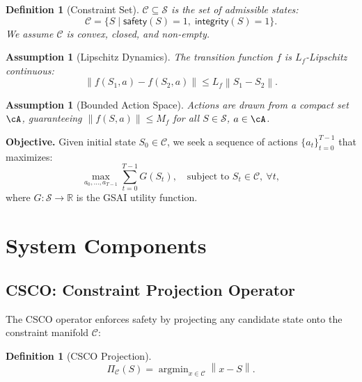 \documentclass[11pt,letterpaper]{article}
\newtheorem{definition}[theorem]{Definition}
\newtheorem{assumption}[theorem]{Assumption}
\newcommand{\cC}{\mathcal{C}}
\newcommand{\cS}{\mathcal{S}}
\newcommand{\bR}{\mathbb{R}}
\newcommand{\norm}[1]{\left\lVert#1\right\rVert}
\newcommand{\argmin}{\operatorname{argmin}}
\begin{document}
\begin{definition}[Constraint Set]
$\cC \subseteq \cS$ is the set of admissible states:
\begin{equation}
    \cC = \{S \mid \textsf{safety}(S) = 1,\; \textsf{integrity}(S) = 1\}.
    \label{eq:constraint_set}
\end{equation}
We assume $\cC$ is convex, closed, and non-empty.
\end{definition}

\begin{assumption}[Lipschitz Dynamics]
The transition function $f$ is $L_f$-Lipschitz continuous:
\begin{equation}
    \norm{f(S_1, a) - f(S_2, a)} \leq L_f \norm{S_1 - S_2}.
    \label{eq:lipschitz_f}
\end{equation}
\end{assumption}

\begin{assumption}[Bounded Action Space]
Actions are drawn from a compact set $\cA$, guaranteeing
$\norm{f(S, a)} \leq M_f$ for all $S \in \cS$, $a \in \cA$.
\end{assumption}

\noindent\textbf{Objective.}
Given initial state $S_0 \in \cC$, we seek a sequence of actions
$\{a_t\}_{t=0}^{T-1}$ that maximizes:
\begin{equation}
    \max_{a_0,\ldots,a_{T-1}} \sum_{t=0}^{T-1} G(S_t),
    \quad \text{subject to } S_t \in \cC,\ \forall t,
    \label{eq:objective}
\end{equation}
where $G: \cS \to \bR$ is the GSAI utility function.

\section{System Components}

\subsection{CSCO: Constraint Projection Operator}

The CSCO operator enforces safety by projecting any candidate state onto
the constraint manifold $\cC$:

\begin{definition}[CSCO Projection]
\begin{equation}
    \Pi_{\cC}(S) = \argmin_{x \in \cC} \norm{x - S}.
    \label{eq:csco_proj}
\end{equation}
\end{definition}
\end{document}
